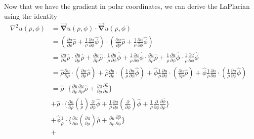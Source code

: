 \documentclass[11pt]{article}
\begin{document}
Now that we have the gradient in polar coordinates, we can derive the
LaPlacian using the identity \begin{equation} 
\begin{split}
\nabla^2 u(\rho, \phi) & = \vec{\mathbf{\nabla}} u(\rho, \phi) \cdot \vec{\mathbf{\nabla}} u(\rho, \phi) 
\\ & =
\left( \frac{\partial u}{\partial \rho} \hat{\rho} + \frac{1}{\rho} \frac{\partial u}{\partial \phi} \hat{\phi} \right) \cdot \left( \frac{\partial u}{\partial \rho} \hat{\rho} + \frac{1}{\rho} \frac{\partial u}{\partial \phi} \hat{\phi} \right) 
\\ & =
\frac {\partial u}{\partial \rho} \hat{\rho} \cdot \frac {\partial u}{\partial \rho} \hat{\rho} + 
\frac {\partial u}{\partial \rho} \hat{\rho} \cdot \frac{1}{\rho} \frac {\partial u}{\partial \phi} \hat{\phi} +
\frac{1}{\rho} \frac {\partial u}{\partial \phi} \hat{\phi} \cdot \frac {\partial u}{\partial \rho} \hat{\rho} + 
\frac{1}{\rho} \frac {\partial u}{\partial \phi} \hat{\phi} \cdot \frac{1}{\rho} \frac {\partial u}{\partial \phi} \hat{\phi}
\\ & =
\hat{\rho} \frac {\partial u}{\partial \rho} \cdot \left( \frac {\partial u}{\partial \rho} \hat{\rho} \right) + 
\hat{\rho} \frac {\partial u}{\partial \rho} \cdot \left( \frac{1}{\rho} \frac {\partial u}{\partial \phi} \hat{\phi} \right) +
\hat{\phi} \frac{1}{\rho} \frac {\partial u}{\partial \phi}  \cdot \left (\frac {\partial u}{\partial \rho} \hat{\rho} \right) + 
\hat{\phi} \frac{1}{\rho} \frac {\partial u}{\partial \phi} \cdot \left( \frac{1}{\rho} \frac {\partial u}{\partial \phi} \hat{\phi} \right)
\\ & =
\hat{\rho} \cdot \Bigg\{\frac {\partial u}{\partial \rho} \frac{\partial u}{\partial \rho} \hat{\rho} + \frac {\partial u}{\partial \rho}\frac{\partial {\hat{\rho}}}{\partial \rho} \Bigg\} 
\\ & + 
\hat{\rho} \cdot \Bigg\{\frac {\partial u}{\partial \rho} \left(\frac{1}{\rho} \right) \frac {\partial }{\partial \phi} \hat{\phi} + \frac{1}{\rho}\frac {\partial u}{\partial \rho} \left(\frac {\partial }{\partial \phi} \right)\hat{\phi} + \frac{1}{\rho}\frac {\partial }{\partial \phi}\frac {\partial \hat{\phi}}{\partial \rho}  \Bigg\} 
\\ & + 
\hat{\phi} \frac{1}{\rho} \cdot \Bigg\{\frac {\partial u}{\partial \phi} \left( \frac {\partial u}{\partial \rho} \right) \hat{\rho} +  \frac {\partial u}{\partial \rho} \frac {\partial \hat{\rho}}{\partial \phi} \Bigg\} 
\\ & + 

\end{split}
\end{equation}
\end{document}
